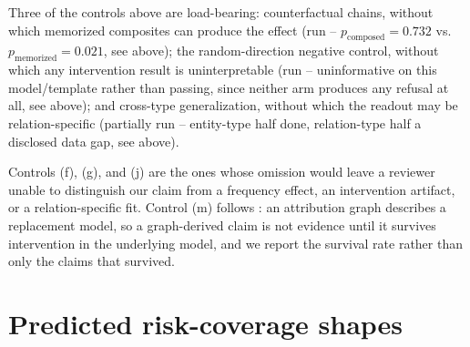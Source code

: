 \documentclass{article}
\begin{document}
Three of the controls above are load-bearing: counterfactual chains, without which memorized
composites can produce the effect (run -- $p_{\mathrm{composed}}=0.732$ vs.\ $p_{\mathrm{memorized}}=0.021$,
see above); the
random-direction negative control, without which any intervention result is uninterpretable (run --
uninformative on this model/template rather than passing, since neither arm produces any refusal at
all, see above); and
cross-type generalization, without which the readout may be relation-specific (partially run --
entity-type half done, relation-type half a disclosed data gap, see above).


Controls (f), (g), and (j) are the ones whose omission would leave a reviewer unable to distinguish
our claim from a frequency effect, an intervention artifact, or a relation-specific fit. Control (m)
follows \citet{lindsey2025biology}: an attribution graph describes a replacement model, so a
graph-derived claim is not evidence until it survives intervention in the underlying model, and we
report the survival rate rather than only the claims that survived.

\section{Predicted risk-coverage shapes}
\label{app:hyp}
\end{document}
